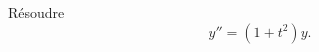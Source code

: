 
\begin{exercice}\label{exo_II-1-23}

Résoudre
\begin{equation}
	y''=(1+t^2)y.
\end{equation}


\end{exercice}
